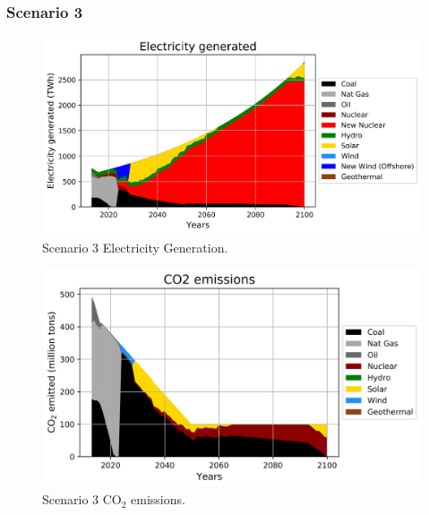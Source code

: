 \begin{frame}
  \frametitle{Scenario 3}
  \begin{figure}[htbp!]
    \begin{center}
      \includegraphics[scale=0.6]{./images/i2cner_nuc_elc}
    \end{center}
          \caption{Scenario 3 Electricity Generation.}
    \label{s3e}
  \end{figure}
\end{frame}

\begin{frame}
  \begin{figure}[htbp!]
    \begin{center}
      \includegraphics[scale=0.6]{./images/i2cner_nuc_co2}
    \end{center}
          \caption{Scenario 3 CO$_2$ emissions.}
    \label{s3c}
  \end{figure}

\end{frame}